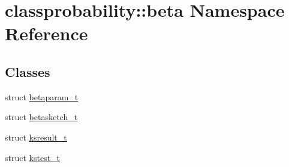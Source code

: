 \hypertarget{namespaceclassprobability_1_1beta}{}\section{classprobability\+:\+:beta Namespace Reference}
\label{namespaceclassprobability_1_1beta}
\subsection*{Classes}
\begin{DoxyCompactItemize}
\item 
struct \hyperlink{structclassprobability_1_1beta_1_1betaparam__t}{betaparam\+\_\+t}
\item 
struct \hyperlink{structclassprobability_1_1beta_1_1betasketch__t}{betasketch\+\_\+t}
\item 
struct \hyperlink{structclassprobability_1_1beta_1_1ksresult__t}{ksresult\+\_\+t}
\item 
struct \hyperlink{structclassprobability_1_1beta_1_1kstest__t}{kstest\+\_\+t}
\end{DoxyCompactItemize}
